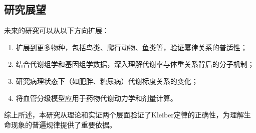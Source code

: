 \subsection{研究展望}

未来的研究可以从以下方向扩展：

\begin{enumerate}
    \item 扩展到更多物种，包括鸟类、爬行动物、鱼类等，验证幂律关系的普适性；
    \item 结合代谢组学和基因组学数据，深入理解代谢率与体重关系背后的分子机制；
    \item 研究病理状态下（如肥胖、糖尿病）代谢标度关系的变化；
    \item 将血管分级模型应用于药物代谢动力学和剂量计算。
\end{enumerate}

综上所述，本研究从理论和实证两个层面验证了Kleiber定律的正确性，为理解生命现象的普遍规律提供了重要依据。
